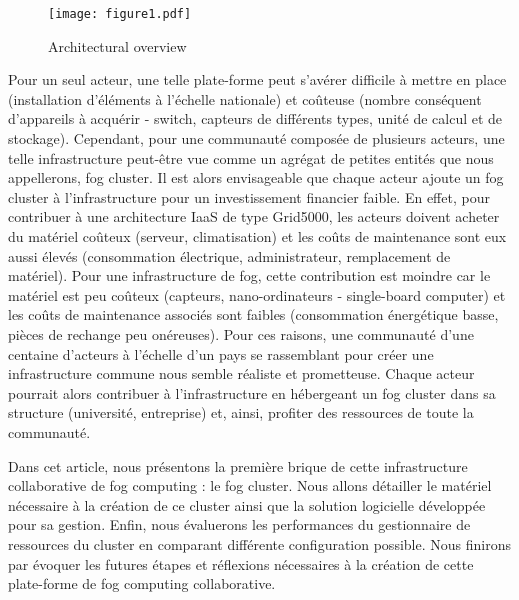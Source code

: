\documentclass[letterpaper, 10 pt, conference]{ieeeconf}
\begin{document}
\begin{figure}[ht]
  \vspace*{-.2cm}
  \begin{center}
  \subcapcentertrue
  \texttt{[image: figure1.pdf]}
  \caption{Architectural overview}
  \label{fig:overview}
  \end{center}
\vspace*{-.3cm}
\end{figure}

Pour un seul acteur, une telle plate-forme peut s'avérer difficile à mettre en place (installation d'éléments à l'échelle nationale) et coûteuse (nombre conséquent d'appareils à acquérir - switch, capteurs de différents types, unité de calcul et de stockage). Cependant, pour une communauté composée de plusieurs acteurs, une telle infrastructure peut-être vue comme un agrégat de petites entités que nous appellerons, fog cluster. Il est alors envisageable que chaque acteur ajoute un fog cluster à l'infrastructure pour un investissement financier faible. En effet, pour contribuer à une architecture IaaS de type Grid5000, les acteurs doivent acheter du matériel coûteux (serveur, climatisation) et les coûts de maintenance sont eux aussi élevés (consommation électrique, administrateur, remplacement de matériel). Pour une infrastructure de fog, cette contribution est moindre car le matériel est peu coûteux (capteurs, nano-ordinateurs - single-board computer) et les coûts de maintenance associés sont faibles (consommation énergétique basse, pièces de rechange peu onéreuses). Pour ces raisons, une communauté d'une centaine d'acteurs à l'échelle d'un pays se rassemblant pour créer une infrastructure commune nous semble réaliste et prometteuse. Chaque acteur pourrait alors contribuer à l'infrastructure en hébergeant un fog cluster dans sa structure (université, entreprise) et, ainsi, profiter des ressources de toute la communauté. 

Dans cet article, nous présentons la première brique de cette infrastructure collaborative de fog computing : le fog cluster. Nous allons détailler le matériel nécessaire à la création de ce cluster ainsi que la solution logicielle développée pour sa gestion. Enfin, nous évaluerons les performances du gestionnaire de ressources du cluster en comparant différente configuration possible. Nous finirons par évoquer les futures étapes et réflexions nécessaires à la création de cette plate-forme de fog computing collaborative.

\end{document}
